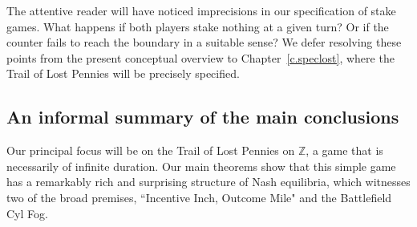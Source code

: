 \documentclass[letterpaper,11pt,oneside,reqno]{amsbook}
\newcommand{\Z}{\ensuremath{\mathbb{Z}}}
\numberwithin{figure}{chapter}
\theoremstyle{definition}
\theoremstyle{definition}
\theoremstyle{definition}
\theoremstyle{definition}
\theoremstyle{definition}
\begin{document}
 The attentive reader will have noticed imprecisions in our specification of stake games. What happens if both players stake nothing at a given turn? Or if the counter fails to reach the boundary in a suitable sense? We defer resolving these points from the present conceptual overview to Chapter~\ref{c.speclost}, where the Trail of Lost Pennies will be precisely specified.
 
 \subsection{An informal summary of the main conclusions}
 Our principal focus will be on the Trail of Lost Pennies on $\Z$, a game that is necessarily of infinite duration. 
 Our main theorems show that this simple game has a remarkably rich and surprising structure of Nash equilibria, which witnesses two of the broad premises, ``Incentive Inch, Outcome Mile" and the Battlefield Cyl Fog.
 
\end{document}
